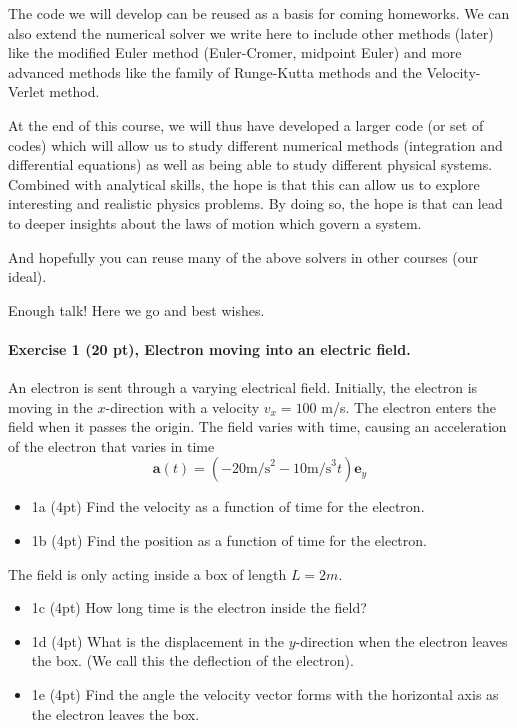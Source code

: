 \documentclass[%
oneside,                 %
final,                   %
10pt]{article}
\begin{document}
The code we will develop can be reused as a basis for coming homeworks. We can
also extend the numerical solver we write here to include other methods (later) like
the modified Euler method (Euler-Cromer, midpoint Euler) and more
advanced methods like the family of Runge-Kutta methods and the Velocity-Verlet method.

At the end of this course, we will thus have developed a larger code
(or set of codes) which will allow us to study different numerical
methods (integration and differential equations) as well as being able
to study different physical systems. Combined with analytical skills,
the hope is that this can allow us to explore interesting and
realistic physics problems. By doing so, the hope is that can lead to
deeper insights about the laws of motion which govern a system.

And hopefully you can reuse many of the above solvers in other courses (our ideal).

Enough talk!  Here we go and best wishes.

\paragraph{Exercise 1 (20 pt), Electron moving into an electric field.}
An electron is sent through a varying electrical
field. Initially, the electron is moving in the $x$-direction with a velocity
$v_x = 100$ m/s. The electron enters the field when it passes the origin. The field
varies with time, causing an acceleration of the electron that varies in time
\[
\bm{a}(t)=\left(−20 \mathrm{m/s}^2 −10\mathrm{m/s}^3t\right) \bm{e}_y
\]
\begin{itemize}
\item 1a (4pt) Find the velocity as a function of time for the electron.

\item 1b (4pt)  Find the position as a function of time for the electron.
\end{itemize}

\noindent
The field is only acting inside a box of length $L = 2m$.
\begin{itemize}
\item 1c (4pt)  How long time is the electron inside the field?

\item 1d (4pt)  What is the displacement in the $y$-direction when the electron leaves the box. (We call this the deflection of the electron).

\item 1e (4pt)  Find the angle the velocity vector forms with the horizontal axis as the electron leaves the box.
\end{itemize}
\end{document}
